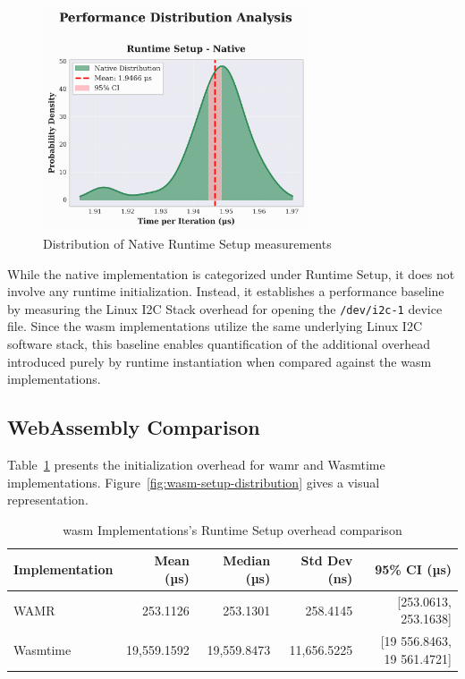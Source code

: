 \begin{figure}[htbp]
    \centering
    \includegraphics[width=0.7\textwidth]{images/native-setup-distribution}
    \caption{Distribution of Native Runtime Setup measurements}
    \label{fig:native-setup-distribution}
\end{figure}

While the native implementation is categorized under Runtime Setup, it does not involve any runtime initialization. Instead, it establishes a performance baseline by measuring the Linux I2C Stack overhead for opening the \texttt{/dev/i2c-1} device file. Since the \acrshort{wasm} implementations utilize the same underlying Linux I2C software stack, this baseline enables quantification of the additional overhead introduced purely by runtime instantiation when compared against the \acrshort{wasm} implementations.

\subsection{WebAssembly Comparison}
\label{subsec:eval-setup-wasm}

Table~\ref{tab:wasm-setup} presents the initialization overhead for \acrshort{wamr} and Wasmtime implementations. Figure~\ref{fig:wasm-setup-distribution} gives a visual representation.

\begin{table}[htbp]
    \centering
    \caption{\acrshort{wasm} Implementations's Runtime Setup overhead comparison}
    \label{tab:wasm-setup}
    \begin{tabular}{lrrrr}
        \toprule
        \textbf{Implementation} & \textbf{Mean (µs)} & \textbf{Median (µs)} & \textbf{Std Dev (ns)} & \textbf{95\% CI (µs)} \\
        \midrule
        WAMR        & 253.1126 & 253.1301 & 258.4145 & [253.0613, 253.1638] \\
        Wasmtime    & 19,559.1592 & 19,559.8473 & 11,656.5225 & [19 556.8463, 19 561.4721] \\
        \bottomrule
    \end{tabular}
\end{table}

